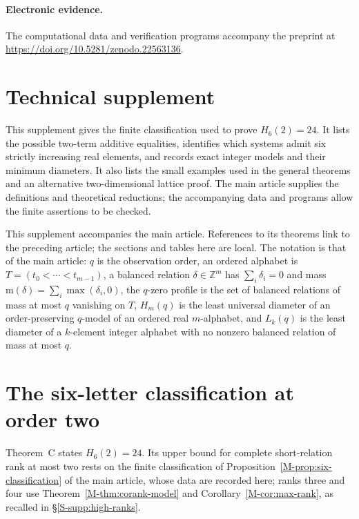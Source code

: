 \documentclass[11pt,reqno]{amsart}
\theoremstyle{plain}
\theoremstyle{definition}
\theoremstyle{plain}
\newcommand{\Z}{\mathbb{Z}}
\newcommand{\mass}{\mathrm{m}}
\theoremstyle{plain}
\theoremstyle{plain}
\theoremstyle{plain}
\theoremstyle{plain}
\theoremstyle{plain}
\theoremstyle{definition}
\theoremstyle{definition}
\theoremstyle{definition}
\theoremstyle{plain}
\providecommand{\MainPrefix}{}
\providecommand{\SuppPrefix}{}
\begin{document}
\paragraph{Electronic evidence.}
The computational data and verification programs accompany the preprint at
\url{https://doi.org/10.5281/zenodo.22563136}.

\clearpage
\hypertarget{supplement-start}{}
\setcounter{section}{0}\setcounter{subsection}{0}
\setcounter{equation}{0}
\setcounter{table}{0}\setcounter{figure}{0}
\renewcommand{\MainPrefix}{Main }\renewcommand{\SuppPrefix}{}
\section*{Technical supplement}

This supplement gives the finite classification used to prove $H_6(2)=24$.
It lists the possible two-term additive equalities, identifies which
systems admit six strictly increasing real elements, and records exact
integer models and their minimum diameters. It also lists the small
examples used in the general theorems and an alternative two-dimensional lattice proof. The main article supplies the
definitions and theoretical reductions; the accompanying data and programs
allow the finite assertions to be checked.





\noindent This supplement accompanies the main article. References to its
theorems link to the preceding article; the sections and tables here are local.
The notation is that of the main article: $q$ is the
observation order, an ordered alphabet is $T=(t_0<\cdots<t_{m-1})$, a
balanced relation $\delta\in\Z^m$ has $\sum_i\delta_i=0$ and mass
$\mass(\delta)=\sum_i\max(\delta_i,0)$, the $q$-zero profile is the set of
balanced relations of mass at most $q$ vanishing on $T$, $H_m(q)$ is the
least universal diameter of an order-preserving $q$-model of an ordered real
$m$-alphabet, and $L_k(q)$ is the least diameter of a $k$-element integer
alphabet with no nonzero balanced relation of mass at most $q$.

\section{The six-letter classification at order two}\label{S-supp:six}

Theorem~C states $H_6(2)=24$. Its upper bound for complete short-relation
rank at most two rests on the finite classification of
Proposition~\ref{M-prop:six-classification} of the main article, whose data are recorded here; ranks
three and four use Theorem~\ref{M-thm:corank-model} and Corollary~\ref{M-cor:max-rank}, as recalled in
\S\ref{S-supp:high-ranks}.
\end{document}
